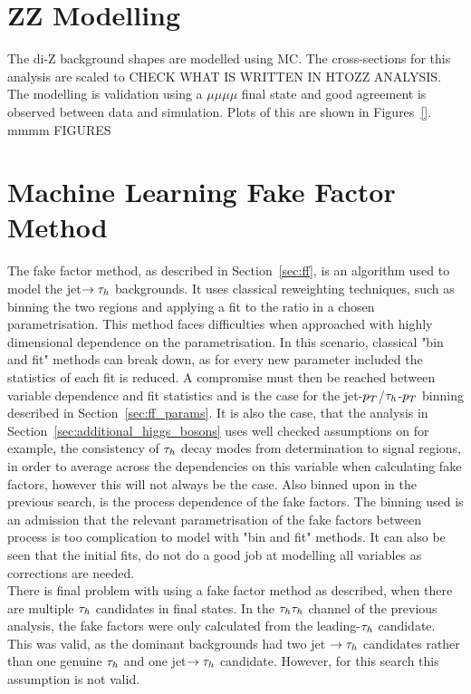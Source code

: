 \section{ZZ Modelling}
\label{sec:zz_modelling}

The di-Z background shapes are modelled using MC.
The cross-sections for this analysis are scaled to CHECK WHAT IS WRITTEN IN HTOZZ ANALYSIS.
The modelling is validation using a $\mu\mu\mu\mu$ final state and good agreement is observed between data and simulation.
Plots of this are shown in Figures~\ref{}. \\

mmmm FIGURES \\


\section{Machine Learning Fake Factor Method}
\label{sec:ml_ff}

The fake factor method, as described in Section~\ref{sec:ff}, is an algorithm used to model the jet$\rightarrow \tau_{h}$ backgrounds.
It uses classical reweighting techniques, such as binning the two regions and applying a fit to the ratio in a chosen parametrisation.
This method faces difficulties when approached with highly dimensional dependence on the parametrisation.
In this scenario, classical "bin and fit" methods can break down, as for every new parameter included the statistics of each fit is reduced.
A compromise must then be reached between variable dependence and fit statistics and is the case for the jet-$p_{T}$/$\tau_{h}$-$p_{T}$ binning described in Section~\ref{sec:ff_params}.
It is also the case, that the analysis in Section~\ref{sec:additional_higgs_bosons} uses well checked assumptions on for example, the consistency of $\tau_{h}$ decay modes from determination to signal regions, in order to average across the dependencies on this variable when calculating fake factors, however this will not always be the case.
Also binned upon in the previous search, is the process dependence of the fake factors.
The binning used is an admission that the relevant parametrisation of the fake factors between process is too complication to model with "bin and fit" methods.
It can also be seen that the initial fits, do not do a good job at modelling all variables as corrections are needed. \\

There is final problem with using a fake factor method as described, when there are multiple $\tau_{h}$ candidates in final states. 
In the $\tau_{h}\tau_{h}$ channel of the previous analysis, the fake factors were only calculated from the leading-$\tau_{h}$ candidate.
This was valid, as the dominant backgrounds had two jet $\rightarrow\tau_{h}$ candidates rather than one genuine $\tau_{h}$ and one jet$\rightarrow\tau_{h}$ candidate.
However, for this search this assumption is not valid. \\

